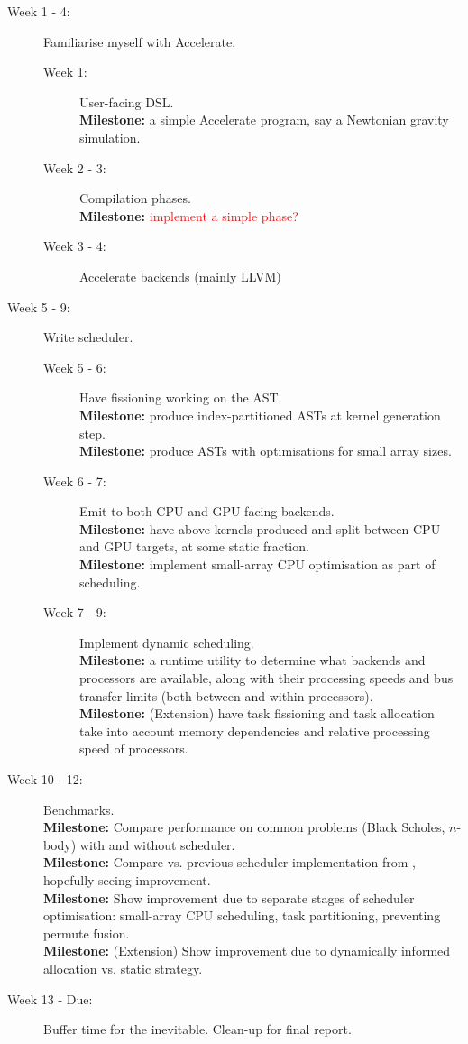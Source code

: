 \documentclass[a4paper,12pt]{article}
\newcommand{\red}[1]{\textcolor{red}{#1}}
\newcommand{\milestone}[0]{\textbf{Milestone:} }
\begin{document}
\begin{description}
  \item[Week 1 - 4:] 
    Familiarise myself with Accelerate.
    \begin{description}
      \item[Week 1:] 
        User-facing DSL. 
        \\\milestone a simple Accelerate program, say a Newtonian gravity simulation.
      \item[Week 2 - 3:] 
        Compilation phases. 
        \\\milestone \red{implement a simple phase?}
      \item[Week 3 - 4:] 
        Accelerate backends (mainly LLVM)
    \end{description}
  \item[Week 5 - 9:] 
    Write scheduler.
    \begin{description}
      \item[Week 5 - 6:] 
        Have fissioning working on the AST. 
        \\\milestone produce index-partitioned ASTs at kernel generation step.
        \\\milestone produce ASTs with optimisations for small array sizes.
      \item[Week 6 - 7:]
        Emit to both CPU and GPU-facing backends. 
        \\\milestone have above kernels produced and split between CPU and GPU targets, at some static fraction.
        \\\milestone implement small-array CPU optimisation as part of scheduling.
      \item[Week 7 - 9:]
        Implement dynamic scheduling.
        \\\milestone a runtime utility to determine what backends and processors are available, along with their processing speeds and bus transfer limits (both between and within processors).
        \\\milestone (Extension) have task fissioning and task allocation take into account memory dependencies and relative processing speed of processors.
    \end{description}
  \item[Week 10 - 12:]
    Benchmarks.
    \\\milestone Compare performance on common problems (Black Scholes, $n$-body) with and without scheduler.
    \\\milestone Compare vs. previous scheduler implementation from \citet{newton_converting_2014}, hopefully seeing improvement.
    \\\milestone Show improvement due to separate stages of scheduler optimisation: small-array CPU scheduling, task partitioning, preventing permute fusion.
    \\\milestone (Extension) Show improvement due to dynamically informed allocation vs. static strategy.
  \item[Week 13 - Due:] Buffer time for the inevitable. Clean-up for final report.
\end{description}
\end{document}
